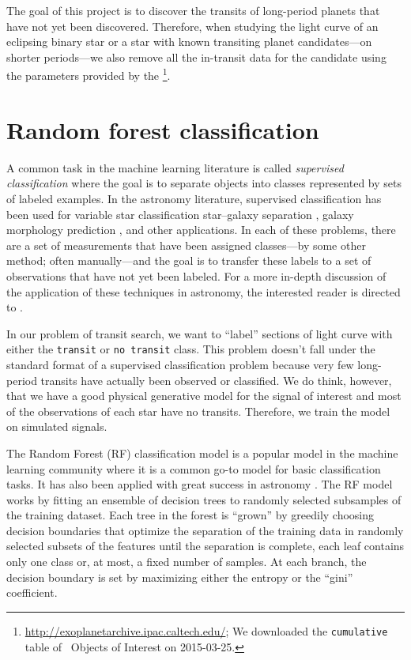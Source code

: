 The goal of this project is to discover the transits of long-period planets
that have not yet been discovered.
Therefore, when studying the light curve of an eclipsing binary star or a star
with known transiting planet candidates---on shorter periods---we also remove
all the in-transit data for the candidate using the parameters provided by the
\footnote{\url{http://exoplanetarchive.ipac.caltech.edu/}; We
downloaded the \texttt{cumulative} table of \kepler\ Objects of Interest on
2015-03-25.}.



\section{Random forest classification}

A common task in the machine learning literature is called \emph{supervised
classification} where the goal is to separate objects into classes
represented by sets of labeled examples.
In the astronomy literature, supervised classification has been used for
variable star classification \citep{Richards:2011} star--galaxy separation
\citep{Fadely:2012}, galaxy morphology prediction \citep{Dieleman:2015}, and
other applications.
In each of these problems, there are a set of measurements that have been
assigned classes---by some other method; often manually---and the goal is to
transfer these labels to a set of observations that have not yet been
labeled.
For a more in-depth discussion of the application of these techniques in
astronomy, the interested reader is directed to \citet{Ivezic:2013}.

In our problem of transit search, we want to ``label'' sections of light curve
with either the \texttt{transit} or \texttt{no transit} class.
This problem doesn't fall under the standard format of a supervised
classification problem because very few long-period transits have actually
been observed or classified.
We do think, however, that we have a good physical generative model for the
signal of interest and most of the observations of each star have no transits.
Therefore, we train the model on simulated signals.

The Random Forest (RF) classification model \citep{Breiman:2001} is a popular
model in the machine learning community where it is a common go-to model for
basic classification tasks.
It has also been applied with great success in astronomy \citep[for
example][]{Richards:2011, Richards:2012, Jenkins:2014}.
The RF model works by fitting an ensemble of decision trees to randomly
selected subsamples of the training dataset.
Each tree in the forest is ``grown'' by greedily choosing decision boundaries
that optimize the separation of the training data in randomly selected
subsets of the features until the separation is complete, each leaf contains
only one class or, at most, a fixed number of samples.
At each branch, the decision boundary is set by maximizing either the entropy
or the ``gini'' coefficient.

